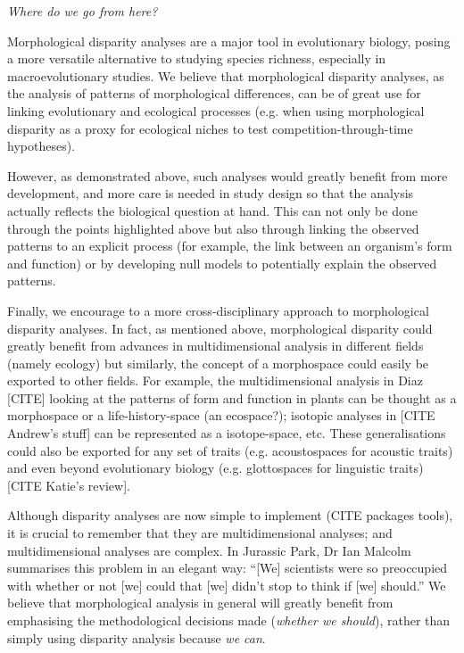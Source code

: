 \documentclass[12pt,letterpaper]{article}
\renewcommand{\subsection}[1]{%
\bigskip
\begin{center}
\begin{large}
\normalfont\itshape #1
\end{large}
\end{center}}
\begin{document}
\subsection{Where do we go from here?}
Morphological disparity analyses are a major tool in evolutionary biology, posing a more versatile alternative to studying species richness, especially in macroevolutionary studies.
We believe that morphological disparity analyses, as the analysis of patterns of morphological differences, can be of great use for linking evolutionary and ecological processes (e.g. when using morphological disparity as a proxy for ecological niches to test competition-through-time hypotheses).

However, as demonstrated above, such analyses would greatly benefit from more development, and  more care is needed in study design so that the analysis actually reflects the biological question at hand.
This can not only be done through the points highlighted above but also through linking the observed patterns to an explicit process (for example, the link between an organism's form and function) or by developing null models to potentially explain the observed patterns.

Finally, we encourage to a more cross-disciplinary approach to morphological disparity analyses.
In fact, as mentioned above, morphological disparity could greatly benefit from advances in multidimensional analysis in different fields (namely ecology) but similarly, the concept of a morphospace could easily be exported to other fields.
For example, the multidimensional analysis in Diaz [CITE] looking at the patterns of form and function in plants can be thought as a morphospace or a life-history-space (an ecospace?); isotopic analyses in [CITE Andrew's stuff] can be represented as a isotope-space, etc.
These generalisations could also be exported for any set of traits (e.g. acoustospaces for acoustic traits) and even beyond evolutionary biology (e.g. glottospaces for linguistic traits) [CITE Katie's review].

Although disparity analyses are now simple to implement (CITE packages tools), it is crucial to remember that they are multidimensional analyses; and multidimensional analyses are complex.
In Jurassic Park, Dr Ian Malcolm summarises this problem in an elegant way: ``[We] scientists were so preoccupied with whether or not [we] could that [we] didn't stop to think if [we] should.''
We believe that morphological analysis in general will greatly benefit from emphasising the methodological decisions made (\textit{whether we should}), rather than simply using disparity analysis because \textit{we can}.
\end{document}
